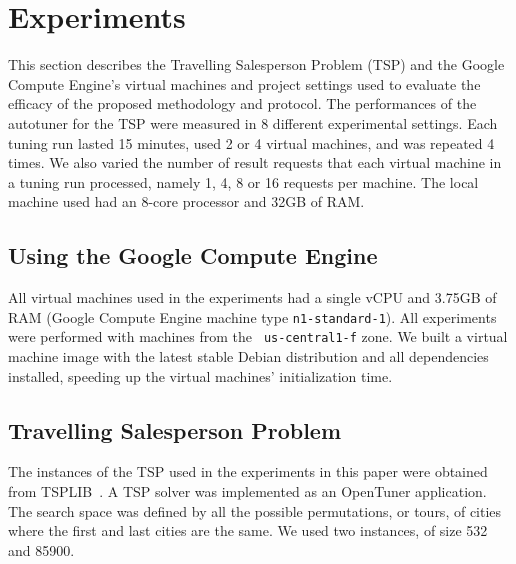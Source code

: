 \section{Experiments} \label{sec:exp}

This section describes the Travelling Salesperson Problem (TSP) and the Google
Compute Engine's virtual machines and project settings used to evaluate the
efficacy of the proposed methodology and protocol.  The performances of
the autotuner for the TSP were measured in 8 different
experimental settings. Each tuning run lasted 15 minutes, used 2 or 4
virtual machines, and was repeated 4 times.  We also varied the number of
result requests that each virtual machine in a tuning run processed, namely 1,
4, 8 or 16 requests per machine.
The local machine used had an 8-core processor and 32GB of RAM.

\subsection{Using the Google Compute Engine}

All virtual machines used in the experiments had a single vCPU and 3.75GB of
RAM (Google Compute Engine machine type \texttt{\footnotesize n1-standard-1}).
All experiments were performed with machines from the \texttt{\footnotesize
us-central1-f} zone. We built a virtual machine image with the latest stable
Debian distribution and all dependencies installed, speeding up the virtual
machines' initialization time.

\subsection{Travelling Salesperson Problem}

The instances of the TSP used in the experiments in this paper were obtained
from TSPLIB~\cite{reinelt1991tsplib}.  A TSP solver was implemented as an
OpenTuner application. The search space was defined by all the possible
permutations, or tours, of cities where the first and last cities are the same.
We used two instances, of size 532 and 85900.
